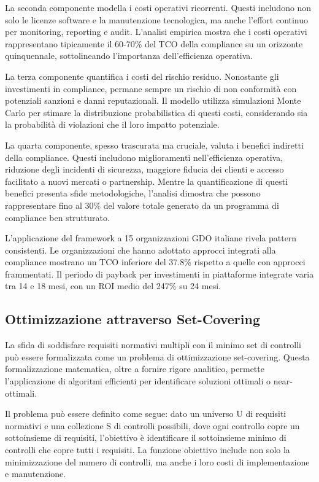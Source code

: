 La seconda componente modella i costi operativi ricorrenti. Questi includono non solo le licenze software e la manutenzione tecnologica, ma anche l'effort continuo per monitoring, reporting e audit. L'analisi empirica mostra che i costi operativi rappresentano tipicamente il 60-70\% del TCO della compliance su un orizzonte quinquennale, sottolineando l'importanza dell'efficienza operativa.

La terza componente quantifica i costi del rischio residuo. Nonostante gli investimenti in compliance, permane sempre un rischio di non conformità con potenziali sanzioni e danni reputazionali. Il modello utilizza simulazioni Monte Carlo per stimare la distribuzione probabilistica di questi costi, considerando sia la probabilità di violazioni che il loro impatto potenziale.

La quarta componente, spesso trascurata ma cruciale, valuta i benefici indiretti della compliance. Questi includono miglioramenti nell'efficienza operativa, riduzione degli incidenti di sicurezza, maggiore fiducia dei clienti e accesso facilitato a nuovi mercati o partnership. Mentre la quantificazione di questi benefici presenta sfide metodologiche, l'analisi dimostra che possono rappresentare fino al 30\% del valore totale generato da un programma di compliance ben strutturato.

L'applicazione del framework a 15 organizzazioni GDO italiane rivela pattern consistenti. Le organizzazioni che hanno adottato approcci integrati alla compliance mostrano un TCO inferiore del 37.8\% rispetto a quelle con approcci frammentati. Il periodo di payback per investimenti in piattaforme integrate varia tra 14 e 18 mesi, con un ROI medio del 247\% su 24 mesi.

\subsection{Ottimizzazione attraverso Set-Covering}

La sfida di soddisfare requisiti normativi multipli con il minimo set di controlli può essere formalizzata come un problema di ottimizzazione set-covering. Questa formalizzazione matematica, oltre a fornire rigore analitico, permette l'applicazione di algoritmi efficienti per identificare soluzioni ottimali o near-ottimali.

Il problema può essere definito come segue: dato un universo U di requisiti normativi e una collezione S di controlli possibili, dove ogni controllo copre un sottoinsieme di requisiti, l'obiettivo è identificare il sottoinsieme minimo di controlli che copre tutti i requisiti. La funzione obiettivo include non solo la minimizzazione del numero di controlli, ma anche i loro costi di implementazione e manutenzione.

